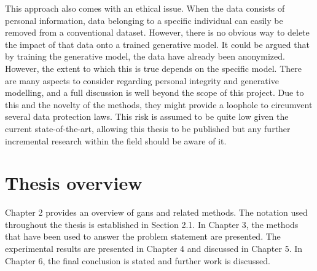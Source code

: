 This approach also comes with an ethical issue. When the data consists of personal information, data belonging to a specific individual can easily be removed from a conventional dataset. However, there is no obvious way to delete the impact of that data onto a trained generative model. It could be argued that by training the generative model, the data have already been anonymized. However, the extent to which this is true depends on the specific model. There are many aspects to consider regarding personal integrity and generative modelling, and a full discussion is well beyond the scope of this project. Due to this and the novelty of the methods, they might provide a loophole to circumvent several data protection laws. This risk is assumed to be quite low given the current state-of-the-art, allowing this thesis to be published but any further incremental research within the field should be aware of it.

\section{Thesis overview}
Chapter 2 provides an overview of \acrlong{gans} and related methods. The notation used throughout the thesis is established in Section 2.1. In Chapter 3, the methods that have been used to answer the problem statement are presented. The experimental results are presented in Chapter 4 and discussed in Chapter 5. In Chapter 6, the final conclusion is stated and further work is discussed.



